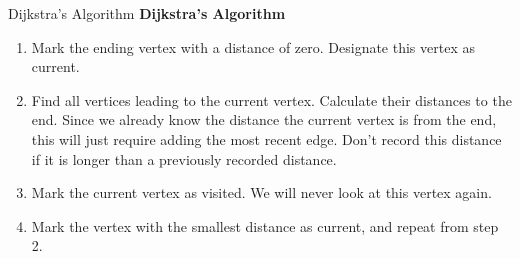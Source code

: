 \begin{algorithm}{Dijkstra's Algorithm}{}{}
{\Large \textbf{Dijkstra's Algorithm} } \\
\hspace{3in}

\begin{enumerate}
\item	Mark the ending vertex with a distance of zero.  Designate this vertex as current.

\dijkstra{$\infty$}{$\infty$}{$\infty$}{$\infty$}{$\infty$}{$\infty$}

\item Find all vertices leading to the current vertex.  Calculate their distances to the end.  Since we already know the distance the current vertex is from the end, this will just require adding the most recent edge.  Don't record this distance if it is longer than a previously recorded distance.
\item	Mark the current vertex as visited.  We will never look at this vertex again.
\item	Mark the vertex with the smallest distance as current, and repeat from step 2.
\end{enumerate}
 \end{algorithm}

